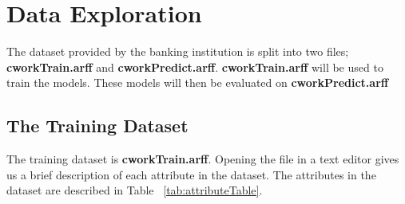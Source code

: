 \documentclass[a4paper,11pt]{article}
\begin{document}
\section{Data Exploration}

The dataset provided by the banking institution is split into two files; \textbf{cworkTrain.arff} and
\textbf{cworkPredict.arff}. \textbf{cworkTrain.arff} will be used to train the models. These models
will then be evaluated on \textbf{cworkPredict.arff}

\subsection{The Training Dataset}

The training dataset is \textbf{cworkTrain.arff}. Opening
the file in a text editor gives us a brief description of each attribute in the dataset.
The attributes in the dataset are described in Table ~\ref{tab:attributeTable}.
\end{document}
